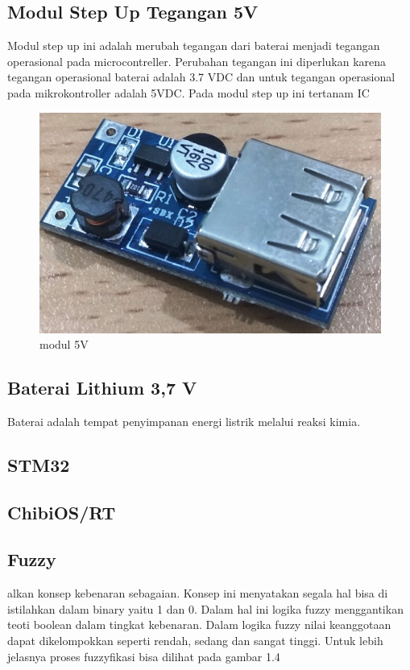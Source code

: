 \documentclass[11pt]{article}
\numberwithin{equation}{subsection}
\begin{document}
\subsection{Modul Step Up Tegangan 5V}
Modul step up ini adalah merubah tegangan dari baterai menjadi tegangan operasional pada microcontreller.
Perubahan tegangan ini diperlukan karena tegangan operasional baterai adalah 3.7 VDC dan untuk tegangan operasional pada mikrokontroller adalah 5VDC.
Pada modul step up ini tertanam IC 
\begin{figure}[!h]
	\centering
	\captionsetup{justification=centering}
	\includegraphics[width=0.7\linewidth]{dokumentasi/modul5v.jpg}
	\caption[modulcharging]{\small{modul 5V}}
\end{figure}
\subsection{Baterai Lithium 3,7 V}
Baterai adalah tempat penyimpanan energi listrik melalui reaksi kimia. 

\subsection{STM32}

\subsection{ChibiOS/RT}

\subsection{Fuzzy}
alkan konsep kebenaran sebagaian.
Konsep ini menyatakan segala hal bisa di istilahkan dalam binary yaitu 1 dan 0.
Dalam hal ini logika fuzzy menggantikan teoti boolean dalam tingkat kebenaran.
Dalam logika fuzzy nilai keanggotaan dapat dikelompokkan seperti rendah, sedang dan sangat tinggi.
Untuk lebih jelasnya proses fuzzyfikasi bisa dilihat pada gambar 1.4
\end{document}
